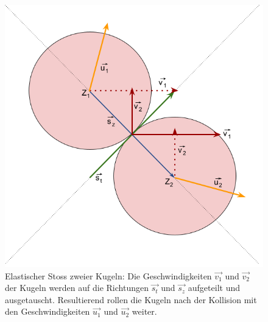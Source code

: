 \begin{figure}[h!]
    \begin{center}
        \includegraphics[width=0.4\linewidth]{../common/03_billiard_ai/resources/23_elastischer_stoss.png}
    \end{center}
    \caption{Elastischer Stoss zweier Kugeln:
    Die Geschwindigkeiten $\vec{v_1}$ und $\vec{v_2}$ der Kugeln werden auf die Richtungen $\vec{s_t}$ und $\vec{s_z}$ aufgeteilt und ausgetauscht.
    Resultierend rollen die Kugeln nach der Kollision mit den Geschwindigkeiten $\vec{u_1}$ und $\vec{u_2}$ weiter.
    }
    \label{fig:Elastischer Stoss zweier Kugeln}
\end{figure}

